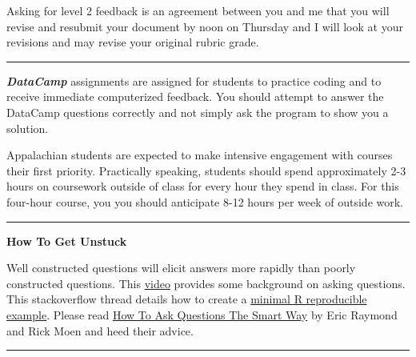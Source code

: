 \documentclass[
]{article}
\begin{document}
Asking for level 2 feedback is an agreement between you and me that you
will revise and resubmit your document by noon on Thursday and I will
look at your revisions and may revise your original rubric grade.

\begin{center}\rule{0.5\linewidth}{0.5pt}\end{center}

\textbf{\emph{DataCamp}} assignments are assigned for students to
practice coding and to receive immediate computerized feedback. You
should attempt to answer the DataCamp questions correctly and not simply
ask the program to show you a solution.

Appalachian students are expected to make intensive engagement with
courses their first priority. Practically speaking, students should
spend approximately 2-3 hours on coursework outside of class for every
hour they spend in class. For this four-hour course, you you should
anticipate 8-12 hours per week of outside work.

\begin{center}\rule{0.5\linewidth}{0.5pt}\end{center}

\textbf{How To Get Unstuck}

Well constructed questions will elicit answers more rapidly than poorly
constructed questions. This
\href{https://www.youtube.com/watch?v=ZFaWxxzouCY\&list=PLjTlxb-wKvXNSDfcKPFH2gzHGyjpeCZmJ\&index=3}{video}
provides some background on asking questions. This stackoverflow thread
details how to create a
\href{http://stackoverflow.com/questions/5963269/how-to-make-a-great-r-reproducible-example/5963610\#5963610}{minimal
R reproducible example}. Please read
\href{http://www.catb.org/~esr/faqs/smart-questions.html}{How To Ask
Questions The Smart Way} by Eric Raymond and Rick Moen and heed their
advice.

\begin{center}\rule{0.5\linewidth}{0.5pt}\end{center}
\end{document}
